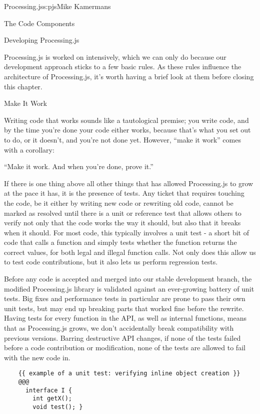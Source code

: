 \begin{aosachapter}{Processing.js}{s:pjs}{Mike Kamermans}
\begin{aosasect1}{The Code Components}
\end{aosasect1}

\begin{aosasect1}{Developing Processing.js}

Processing.js is worked on intensively, which we can only do because
our development approach sticks to a few basic rules. As these rules
influence the architecture of Processing.js, it's worth having a brief
look at them before closing this chapter.

\begin{aosasect2}{Make It Work}

Writing code that works sounds like a tautological premise; you write
code, and by the time you're done your code either works, because
that's what you set out to do, or it doesn't, and you're not done
yet. However, ``make it work'' comes with a corollary:

``Make it work. And when you're done, prove it.''

If there is one thing above all other things that has allowed
Processing.js to grow at the pace it has, it is the presence of
tests. Any ticket that requires touching the code, be it either by
writing new code or rewriting old code, cannot be marked as resolved
until there is a unit or reference test that allows others to verify
not only that the code works the way it should, but also that it
breaks when it should. For most code, this typically involves a unit
test - a short bit of code that calls a function and simply tests
whether the function returns the correct values, for both legal and
illegal function calls. Not only does this allow us to test code
contributions, but it also lets us perform regression tests.

Before any code is accepted and merged into our stable development
branch, the modified Processing.js library is validated against an
ever-growing battery of unit tests. Big fixes and performance tests in
particular are prone to pass their own unit tests, but may end up
breaking parts that worked fine before the rewrite. Having tests for
every function in the API, as well as internal functions, means that
as Processing.js grows, we don't accidentally break compatibility with
previous versions. Barring destructive API changes, if none of the
tests failed before a code contribution or modification, none of the
tests are allowed to fail with the new code in.

\begin{verbatim}
    {{ example of a unit test: verifying inline object creation }}
    @@@
      interface I {
        int getX();
        void test(); }


\end{verbatim}
\end{aosasect2}
\end{aosasect1}
\end{aosachapter}
